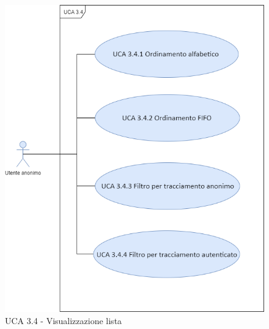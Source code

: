 \begin{figure}[h]
	\centering	
	\includegraphics[scale=0.5]{sezioni/UseCase/Immagini/UCA3.4.png}
	\caption{UCA 3.4 - Visualizzazione lista}
\end{figure}

